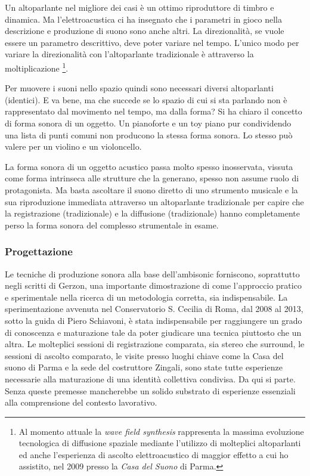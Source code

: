 \documentclass[a4paper,11pt]{article}
\begin{document}
Un altoparlante nel migliore dei casi è un ottimo riproduttore di timbro
e dinamica. Ma l'elettroacustica ci ha insegnato che i parametri in
gioco nella descrizione e produzione di suono sono anche altri. La
direzionalità, se vuole essere un parametro descrittivo, deve poter
variare nel tempo. L'unico modo per variare la direzionalità con
l'altoparlante tradizionale è attraverso la moltiplicazione \footnote{Al momento attuale la \emph{wave field synthesis} rappresenta la
massima evoluzione tecnologica di diffusione spaziale mediante
l'utilizzo di molteplici altoparlanti ed anche l'esperienza di
ascolto elettroacustico di maggior effetto a cui ho assistito, nel
2009 presso la \emph{Casa del Suono} di Parma.}.

Per muovere i suoni nello spazio quindi sono necessari diversi
altoparlanti (identici). E va bene, ma che succede se lo spazio di cui
si sta parlando non è rappresentato dal movimento nel tempo, ma dalla
forma? Si ha chiaro il concetto di forma sonora di un oggetto. Un
pianoforte e un toy piano pur condividendo una lista di punti comuni non
producono la stessa forma sonora. Lo stesso può valere per un violino e
un violoncello.

La forma sonora di un oggetto acustico passa molto spesso inosservata,
vissuta come forma intrinseca alle strutture che la generano, spesso non
assume ruolo di protagonista. Ma basta ascoltare il suono diretto di uno
strumento musicale e la sua riproduzione immediata attraverso un
altoparlante tradizionale per capire che la registrazione (tradizionale)
e la diffusione (tradizionale) hanno completamente perso la forma sonora
del complesso strumentale in esame.

\subsubsection{Progettazione}\hypertarget{progettazione}{}\label{progettazione}

Le tecniche di produzione sonora alla base dell'ambisonic forniscono,
soprattutto negli scritti di Gerzon, una importante dimostrazione di
come l'approccio pratico e sperimentale nella ricerca di un metodologia
corretta, sia indispensabile. La sperimentazione avvenuta nel
Conservatorio S. Cecilia di Roma, dal 2008 al 2013, sotto la guida di
Piero Schiavoni, è stata indispensabile per raggiungere un grado di
conoscenza e maturazione tale da poter giudicare una tecnica piuttosto
che un altra. Le molteplici sessioni di registrazione comparata, sia
stereo che surround, le sessioni di ascolto comparato, le visite presso
luoghi chiave come la Casa del suono di Parma e la sede del costruttore
Zingali, sono state tutte esperienze necessarie alla maturazione di una
identità collettiva condivisa. Da qui si parte. Senza queste premesse
mancherebbe un solido substrato di esperienze essenziali alla
comprensione del contesto lavorativo.
\end{document}
